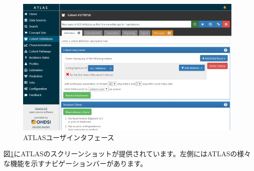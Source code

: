 \documentclass[
  11pt]{book}
\theoremstyle{definition}
\theoremstyle{definition}
\theoremstyle{definition}
\theoremstyle{definition}
\theoremstyle{remark}
\begin{document}
\begin{figure}

{\centering \includegraphics[width=1\linewidth]{images/OhdsiAnalyticsTools/atlas} 

}

\caption{ATLASユーザインタフェース}\label{fig:atlas}
\end{figure}

図\ref{fig:atlas}にATLASのスクリーンショットが提供されています。左側にはATLASの様々な機能を示すナビゲーションバーがあります。
\end{document}
